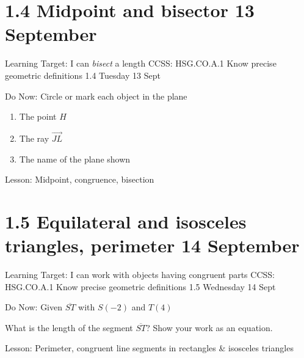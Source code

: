 \documentclass[onlytextwidth]{beamer}
\begin{document}
\section{1.4 Midpoint and bisector \hfill 13 September}
\begin{frame}{Learning Target: I can \emph{bisect} a length}
  {CCSS: HSG.CO.A.1 Know precise geometric definitions  \hfill \alert{1.4 Tuesday 13 Sept}}
  \begin{block}{Do Now: Circle or mark each object in the plane}
    \begin{enumerate} 
      \item The point $H$
      \item The ray $\overrightarrow{JL}$
      \item The name of the plane shown
      \end{enumerate}
    \begin{center}
    \end{center}
    \end{block}
    Lesson: Midpoint, congruence, bisection
  \end{frame}

\section{1.5 Equilateral and isosceles triangles, perimeter \hfill 14 September}
\begin{frame}{Learning Target: I can work with objects having congruent parts}
  {CCSS: HSG.CO.A.1 Know precise geometric definitions  \hfill \alert{1.5 Wednesday 14 Sept}}
    \begin{block}{Do Now: Given $\overline{ST}$ with $S(-2)$ and $T(4)$}
      \begin{center}
      \end{center}
    What is the length of the segment $\overline{ST}$? Show your work as an equation.
    \end{block} \vspace{2cm}
    Lesson: Perimeter, congruent line segments in rectangles \& isosceles triangles
  \end{frame}
\end{document}
